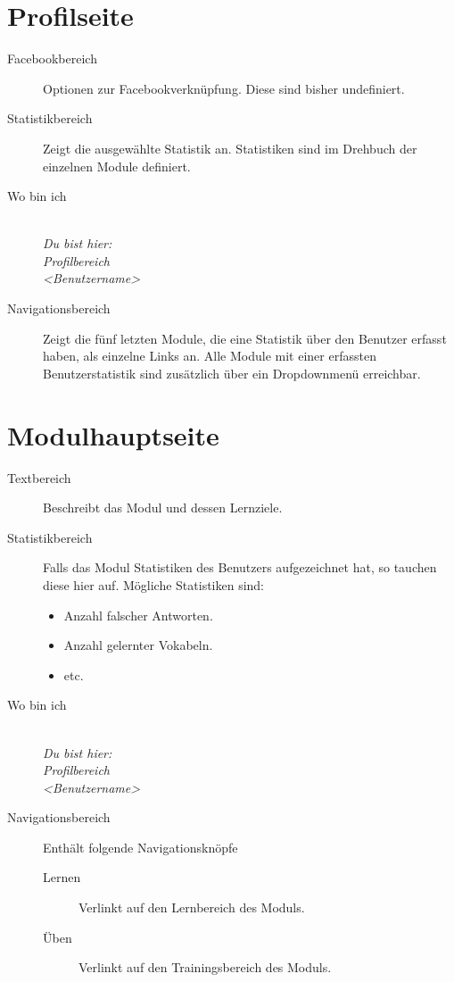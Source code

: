 %
%
%
\section{Profilseite}
\label{sec:profile-page}

\begin{description}
  \item[Facebookbereich] Optionen zur Facebookverknüpfung. Diese sind bisher undefiniert.
  \item[Statistikbereich] Zeigt die ausgewählte Statistik an. Statistiken sind im Drehbuch der einzelnen Module definiert.
  \item[Wo bin ich] \emph{\\Du bist hier:\\Profilbereich\\<Benutzername>}
  \item[Navigationsbereich] Zeigt die fünf letzten Module, die eine Statistik über den Benutzer erfasst haben, als einzelne Links an. 
	Alle Module mit einer erfassten Benutzerstatistik sind zusätzlich über ein Dropdownmenü erreichbar.
\end{description}




%
%
%
\section{Modulhauptseite}
\label{sec:module-main-page}

\begin{description}
  \item[Textbereich] Beschreibt das Modul und dessen Lernziele.
  \item[Statistikbereich] 
    Falls das Modul Statistiken des Benutzers aufgezeichnet hat, so tauchen diese hier auf. Mögliche Statistiken sind:
    \begin{itemize}
      \item Anzahl falscher Antworten.
      \item Anzahl gelernter Vokabeln.
      \item etc.
    \end{itemize}
  \item[Wo bin ich] 
    \emph{\\Du bist hier:\\Profilbereich\\<Benutzername>}
  \item[Navigationsbereich] Enthält folgende Navigationsknöpfe
   \begin{description}
    \item[Lernen] Verlinkt auf den Lernbereich des Moduls.
    \item[Üben] Verlinkt auf den Trainingsbereich des Moduls.
   \end{description}
\end{description}


